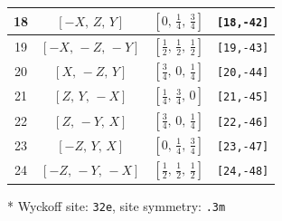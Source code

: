 \documentclass[fleqn,8pt]{jsarticle}
\begin{document}
\begin{longtable}{cccc}
18 & $\left[ - X,\, Z,\, Y \right]$ & $\left[ 0,\, \frac{1}{4},\, \frac{3}{4} \right]$ & {\tt [18,-42]} \\ \hline
19 & $\left[ - X,\, - Z,\, - Y \right]$ & $\left[ \frac{1}{2},\, \frac{1}{2},\, \frac{1}{2} \right]$ & {\tt [19,-43]} \\ \hline
20 & $\left[ X,\, - Z,\, Y \right]$ & $\left[ \frac{3}{4},\, 0,\, \frac{1}{4} \right]$ & {\tt [20,-44]} \\ \hline
21 & $\left[ Z,\, Y,\, - X \right]$ & $\left[ \frac{1}{4},\, \frac{3}{4},\, 0 \right]$ & {\tt [21,-45]} \\ \hline
22 & $\left[ Z,\, - Y,\, X \right]$ & $\left[ \frac{3}{4},\, 0,\, \frac{1}{4} \right]$ & {\tt [22,-46]} \\ \hline
23 & $\left[ - Z,\, Y,\, X \right]$ & $\left[ 0,\, \frac{1}{4},\, \frac{3}{4} \right]$ & {\tt [23,-47]} \\ \hline
24 & $\left[ - Z,\, - Y,\, - X \right]$ & $\left[ \frac{1}{2},\, \frac{1}{2},\, \frac{1}{2} \right]$ & {\tt [24,-48]} \\
\end{longtable}
* Wyckoff site: {\tt 32e}, site symmetry: {\tt .3m}
\renewcommand{\arraystretch}{1.2}
\end{document}
